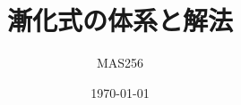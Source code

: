 \documentclass[
  dvipdfmx,
  a4paper,
  10pt,
  nomag,
  fleqn,
  openany
]{jsbook}
\title{漸化式の体系と解法}
\begin{document}
\date{\today}
\author{MAS256}
\maketitle

\begingroup
  \setlength{\parskip}{0pt}
  \ifdefined\BookMobile\linespread{0.85}\else\linespread{1}\fi\selectfont
  \tableofcontents
  \pagebreak
\endgroup






\end{document}
